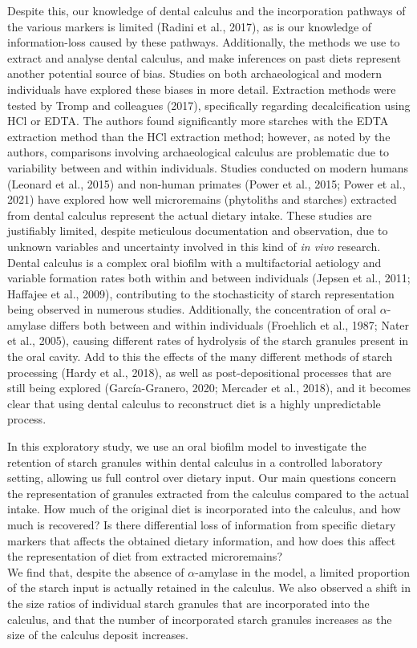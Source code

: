 \documentclass[utf8]{../templates/frontiersSCNS}
\begin{document}
Despite this, our knowledge of dental calculus and the incorporation pathways of
the various markers is limited (Radini et al., 2017), as is our
knowledge of information-loss caused by these pathways. Additionally, the methods
we use to extract and analyse dental calculus, and make inferences on past diets
represent another potential source of bias. Studies on both archaeological and
modern individuals have explored these biases in more detail.
Extraction methods were tested
by Tromp and colleagues (2017), specifically regarding
decalcification using HCl or EDTA.
The authors found significantly more starches with the EDTA extraction method
than the HCl extraction method; however, as noted by the authors, comparisons
involving archaeological calculus are problematic due to variability between and
within individuals.
Studies conducted on modern humans (Leonard et al., 2015)
and non-human primates (Power et al., 2015; Power et al., 2021)
have explored how well microremains (phytoliths and starches)
extracted from dental calculus represent the actual dietary intake.
These studies are justifiably limited,
despite meticulous documentation and observation, due to unknown variables and
uncertainty involved in this kind of \emph{in vivo} research. Dental calculus is a complex
oral biofilm with a multifactorial aetiology and variable formation rates both
within and between individuals (Jepsen et al., 2011; Haffajee et al., 2009),
contributing to
the stochasticity of starch representation being observed in numerous studies.
Additionally, the concentration of oral \(\alpha\)-amylase differs both between and
within individuals (Froehlich et al., 1987; Nater et al., 2005),
causing different rates of hydrolysis of the starch granules present in the oral
cavity. Add to this the effects of the many different methods
of starch processing (Hardy et al., 2018), as well as post-depositional
processes that are still being explored
(García-Granero, 2020; Mercader et al., 2018),
and it becomes clear that using
dental calculus to reconstruct diet is a highly unpredictable process.

In this exploratory study, we use an oral biofilm model to investigate the
retention of starch granules within dental calculus in a controlled laboratory
setting, allowing us full control over dietary input. Our main questions concern
the representation of granules extracted
from the calculus compared to the actual intake. How much of the original diet is
incorporated into the calculus, and how much is recovered?
Is there differential loss of information from specific dietary markers that affects
the obtained dietary information, and how does this affect the representation of
diet from extracted microremains?\\
We find that, despite the absence of \(\alpha\)-amylase in
the model, a limited proportion of the starch input is actually
retained in the calculus. We also observed a shift in the size ratios of individual
starch granules that are incorporated into the calculus, and that the number of
incorporated starch granules increases as the size of the calculus deposit
increases.
\end{document}
